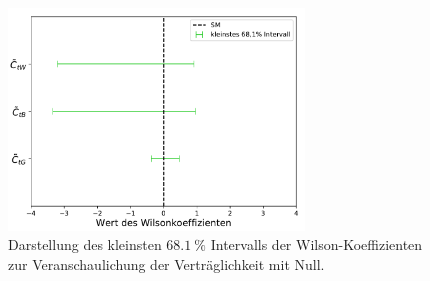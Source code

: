 \begin{figure}
    \centering
    \includegraphics[width=0.7\textwidth]{Plots/wilson.pdf}
    \caption{Darstellung des kleinsten $\SI{68.1}{\percent}$ Intervalls der Wilson-Koeffizienten zur Veranschaulichung der Verträglichkeit mit Null.}
    \label{fig:wil}
\end{figure}
%
%
